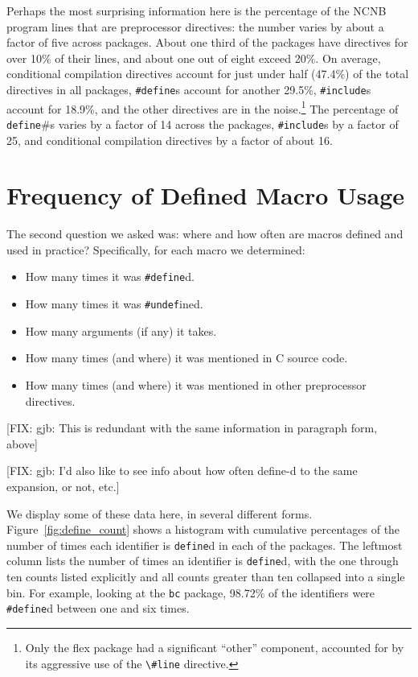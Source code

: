 Perhaps the most surprising information here is the percentage of the
NCNB program lines that are preprocessor directives: the number varies
by about a factor of five across packages.  About one third of the
packages have directives for over 10\% of their lines, and about one
out of eight exceed 20\%.  On average, conditional compilation
directives account for just under half (47.4\%) of the total
directives in all packages, \verb+#define+s account for another
29.5\%, \verb+#include+s account for 18.9\%, and the other directives
are in the noise.\footnote{Only the flex package had a significant
``other'' component, accounted for by its aggressive use of the
\verb+\#line+ directive.} The percentage of \verb+define+#s varies by a factor of 14
across the packages, \verb+#include+s by a factor of 25, and
conditional compilation directives by a factor of about 16.

\section{Frequency of Defined Macro Usage}\label{sec:usage}

The second question we asked was: where and how often are macros
defined and used in practice?  Specifically, for each macro we
determined:
\begin{itemize}\itemsep 0pt \parskip 0pt

\item How many times it was \verb+#define+d.
\item How many times it was \verb+#undef+ined.
\item How many arguments (if any) it takes.
\item How many times (and where) it was mentioned in C source code.
\item How many times (and where) it was mentioned in other
preprocessor directives.

\end{itemize}
[FIX: gjb: This is redundant with the same information in paragraph
form, above]

[FIX: gjb: I'd also like to see info about how often define-d to the same
expansion, or not, etc.]


We display some of these data here, in several different forms.
Figure~\ref{fig:define_count} shows a histogram with cumulative
percentages of the number of times each identifier is \verb+define+d
in each of the packages.  The leftmost column lists the number of
times an identifier is \verb+define+d, with the one through ten counts
listed explicitly and all counts greater than ten collapsed into a
single bin.  For example, looking at the \verb+bc+ package, 98.72\% of
the identifiers were \verb+#define+d between one and six times.

